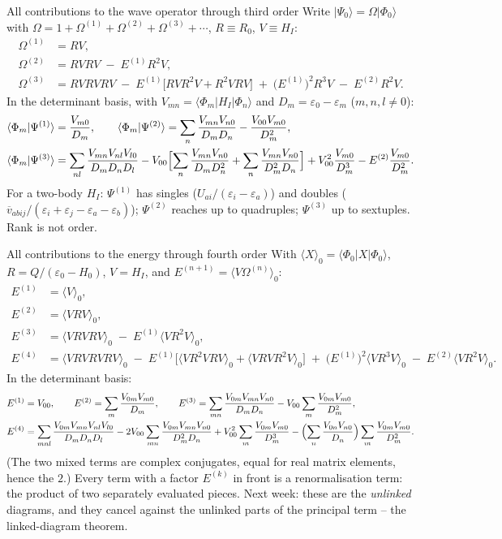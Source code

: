 \documentclass[aspectratio=169,10pt]{beamer}
\newcommand{\ket}[1]{\vert #1\rangle}
\newcommand{\mel}[3]{\langle #1\lvert #2\rvert #3\rangle}
\newcommand{\av}[1]{\langle #1\rangle_0}
\newcommand{\vbar}[4]{\overline v_{#1#2#3#4}}
\newcommand{\ph}{\Phi_0}
\newcommand{\Psizero}{\Psi_0}
\begin{document}
\begin{frame}[shrink=5]{All contributions to the wave operator through third order}
Write \(\ket{\Psizero}=\Omega\ket{\ph}\) with \(\Omega=1+\Omega^{(1)}+\Omega^{(2)}+\Omega^{(3)}+\cdots\), \(R\equiv R_0\), \(V\equiv H_I\):
\begin{align*}
\Omega^{(1)}&=RV,\\[2pt]
\Omega^{(2)}&=RVRV\;-\;E^{(1)}R^2V,\\[2pt]
\Omega^{(3)}&=RVRVRV\;-\;E^{(1)}\bigl[RVR^2V+R^2VRV\bigr]\;+\;\bigl(E^{(1)}\bigr)^2R^3V\;-\;E^{(2)}R^2V .
\end{align*}
In the determinant basis, with \(V_{mn}=\mel{\Phi_m}{H_I}{\Phi_n}\) and \(D_m=\varepsilon_0-\varepsilon_m\) (\(m,n,l\ne0\)):
\begin{align*}
\langle\Phi_m|\Psi^{(1)}\rangle&=\frac{V_{m0}}{D_m},\qquad
\langle\Phi_m|\Psi^{(2)}\rangle=\sum_{n}\frac{V_{mn}V_{n0}}{D_mD_n}-\frac{V_{00}V_{m0}}{D_m^2},\\
\langle\Phi_m|\Psi^{(3)}\rangle&=\sum_{nl}\frac{V_{mn}V_{nl}V_{l0}}{D_mD_nD_l}
-V_{00}\Bigl[\sum_n\frac{V_{mn}V_{n0}}{D_mD_n^2}+\sum_n\frac{V_{mn}V_{n0}}{D_m^2D_n}\Bigr]
+V_{00}^2\frac{V_{m0}}{D_m^3}
-E^{(2)}\frac{V_{m0}}{D_m^2}.
\end{align*}
\small For a two-body \(H_I\): \(\Psi^{(1)}\) has singles (\(U_{ai}/(\varepsilon_i-\varepsilon_a)\)) and doubles (\(\vbar{a}{b}{i}{j}/(\varepsilon_i+\varepsilon_j-\varepsilon_a-\varepsilon_b)\)); \(\Psi^{(2)}\) reaches up to quadruples; \(\Psi^{(3)}\) up to sextuples. Rank is not order.
\end{frame}

\begin{frame}[shrink=5]{All contributions to the energy through fourth order}
With \(\av{X}=\mel{\ph}{X}{\ph}\), \(R=Q/(\varepsilon_0-H_0)\), \(V=H_I\), and \(E^{(n+1)}=\av{V\Omega^{(n)}}\):
\begin{align*}
E^{(1)}&=\av{V},\\[2pt]
E^{(2)}&=\av{VRV},\\[2pt]
E^{(3)}&=\av{VRVRV}\;-\;E^{(1)}\av{VR^2V},\\[2pt]
E^{(4)}&=\av{VRVRVRV}\;-\;E^{(1)}\bigl[\av{VR^2VRV}+\av{VRVR^2V}\bigr]\;+\;\bigl(E^{(1)}\bigr)^2\av{VR^3V}\;-\;E^{(2)}\av{VR^2V}.
\end{align*}
In the determinant basis:
\begin{align*}
E^{(1)}&=V_{00},\qquad E^{(2)}=\sum_m\frac{V_{0m}V_{m0}}{D_m},\qquad
E^{(3)}=\sum_{mn}\frac{V_{0m}V_{mn}V_{n0}}{D_mD_n}-V_{00}\sum_m\frac{V_{0m}V_{m0}}{D_m^2},\\
E^{(4)}&=\sum_{mnl}\frac{V_{0m}V_{mn}V_{nl}V_{l0}}{D_mD_nD_l}
-2V_{00}\sum_{mn}\frac{V_{0m}V_{mn}V_{n0}}{D_m^2D_n}
+V_{00}^2\sum_m\frac{V_{0m}V_{m0}}{D_m^3}
-\Bigl(\sum_n\frac{V_{0n}V_{n0}}{D_n}\Bigr)\sum_m\frac{V_{0m}V_{m0}}{D_m^2}.
\end{align*}
\small (The two mixed terms are complex conjugates, equal for real matrix elements, hence the \(2\).) Every term with a factor \(E^{(k)}\) in front is a renormalisation term: the product of two separately evaluated pieces. Next week: these are the \emph{unlinked} diagrams, and they cancel against the unlinked parts of the principal term -- the linked-diagram theorem.
\end{frame}
\end{document}
